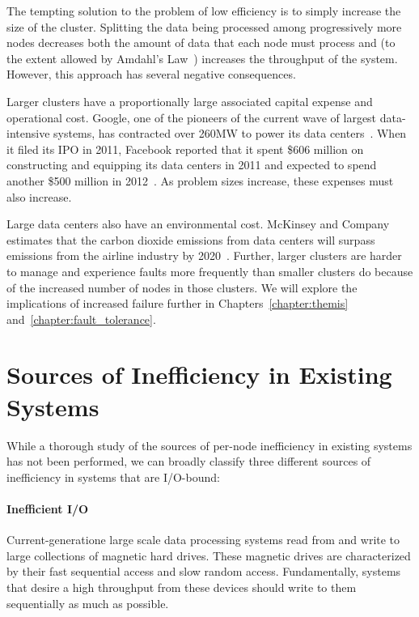 The tempting solution to the problem of low efficiency is to simply increase
the size of the cluster. Splitting the data being processed among progressively
more nodes decreases both the amount of data that each node must process and
(to the extent allowed by Amdahl's Law~\cite{amdahls_law}) increases the
throughput of the system. However, this approach has several negative
consequences.

Larger clusters have a proportionally large associated capital expense and
operational cost. Google, one of the pioneers of the current wave of largest
data-intensive systems, has contracted over 260MW to power its data
centers~\cite{google-dc-power-blog}. When it filed its IPO in 2011, Facebook
reported that it spent \$606 million on constructing and equipping its data
centers in 2011 and expected to spend another \$500 million in
2012~\cite{facebook-ipo}. As problem sizes increase, these expenses must also
increase.

Large data centers also have an environmental cost. McKinsey and Company
estimates that the carbon dioxide emissions from data centers will surpass
emissions from the airline industry by 2020~\cite{mckinsey-co2-study}.
Further, larger clusters are harder to manage and experience faults more
frequently than smaller clusters do because of the increased number of nodes in
those clusters. We will explore the implications of increased failure further
in Chapters~\ref{chapter:themis} and~\ref{chapter:fault_tolerance}.

\section{Sources of Inefficiency in Existing Systems}

While a thorough study of the sources of per-node inefficiency in existing
systems has not been performed, we can broadly classify three different sources
of inefficiency in systems that are I/O-bound:

\paragraph{Inefficient I/O} Current-generatione large scale data processing
systems read from and write to large collections of magnetic hard drives. These
magnetic drives are characterized by their fast sequential access and slow
random access. Fundamentally, systems that desire a high throughput from these
devices should write to them sequentially as much as possible.

